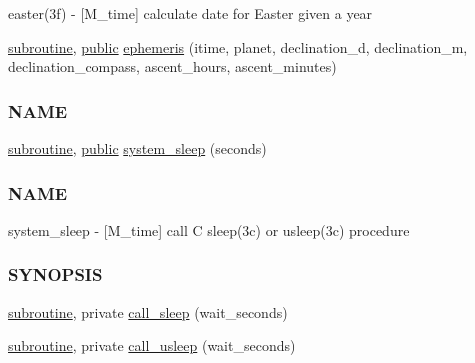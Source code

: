 \begin{DoxyCompactItemize}
\begin{DoxyCompactList}
easter(3f) -\/ \mbox{[}M\+\_\+time\mbox{]} calculate date for Easter given a year \end{DoxyCompactList}\item 
\hyperlink{M__stopwatch_83_8txt_acfbcff50169d691ff02d4a123ed70482}{subroutine}, \hyperlink{M__stopwatch_83_8txt_a2f74811300c361e53b430611a7d1769f}{public} \hyperlink{namespacem__time_a915b29d3b8abeeb7455eb5d6eed28790}{ephemeris} (itime, planet, declination\+\_\+d, declination\+\_\+m, declination\+\_\+compass, ascent\+\_\+hours, ascent\+\_\+minutes)
\begin{DoxyCompactList}\small\item\em \subsubsection*{N\+A\+ME}\end{DoxyCompactList}\item 
\hyperlink{M__stopwatch_83_8txt_acfbcff50169d691ff02d4a123ed70482}{subroutine}, \hyperlink{M__stopwatch_83_8txt_a2f74811300c361e53b430611a7d1769f}{public} \hyperlink{namespacem__time_a7c5d028ae1e1e01162ffc7bb55dcbbb1}{system\+\_\+sleep} (seconds)
\begin{DoxyCompactList}\small\item\em \subsubsection*{N\+A\+ME}

system\+\_\+sleep -\/ \mbox{[}M\+\_\+time\mbox{]} call C sleep(3c) or usleep(3c) procedure \subsubsection*{S\+Y\+N\+O\+P\+S\+IS}\end{DoxyCompactList}\item 
\hyperlink{M__stopwatch_83_8txt_acfbcff50169d691ff02d4a123ed70482}{subroutine}, private \hyperlink{namespacem__time_af558bfc1fd5b13a6b879b3969866956f}{call\+\_\+sleep} (wait\+\_\+seconds)
\item 
\hyperlink{M__stopwatch_83_8txt_acfbcff50169d691ff02d4a123ed70482}{subroutine}, private \hyperlink{namespacem__time_ae63783f7479d2f5093c8031d38ce4304}{call\+\_\+usleep} (wait\+\_\+seconds)
\end{DoxyCompactItemize}
